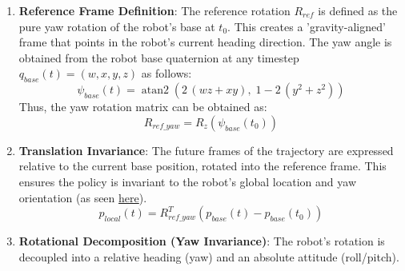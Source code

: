 \begin{enumerate}
\def\labelenumi{\arabic{enumi}.}
\item
  \textbf{Reference Frame Definition}: The reference rotation
  \(R_{ref}\) is defined as the pure yaw rotation of the robot's base at
  \(t_0\). This creates a 'gravity-aligned' frame that points in the
  robot's current heading direction. The yaw angle is obtained from the robot base quaternion at any timestep $q_{base}(t) = (w,x,y,z)$ as follows:
    \[
    \psi_{base}(t) = \operatorname{atan2}\!\left(2\,(w z + x y),\; 1 - 2\,(y^2 + z^2)\right)
    \]
    Thus, the yaw rotation matrix can be obtained as:
  \[ R_{ref\_yaw} = R_z(\psi_{base}(t_0)) \]
\item
  \textbf{Translation Invariance}: The future frames of the
  trajectory are expressed relative to the current base position, rotated
  into the reference frame. This ensures the policy is invariant to the
  robot's global location and yaw orientation (as seen \href{https://drive.google.com/file/d/1xwKxAsxEd1kz2fY9F2qfcvE9ySefHotP/view?usp=drive_link}{here}).
  \[ p_{local}(t) = R_{ref\_yaw}^T (p_{base}(t) - p_{base}(t_0)) \]
\item
  \textbf{Rotational Decomposition (Yaw Invariance)}: The robot's
  rotation is decoupled into a relative heading (yaw) and an absolute
  attitude (roll/pitch).


\end{enumerate}
